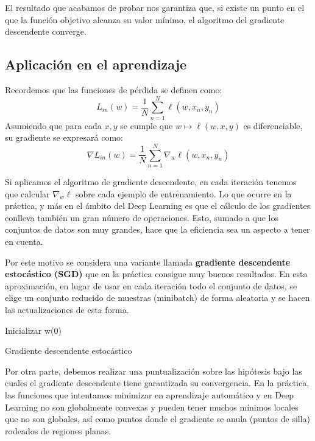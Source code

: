 El resultado que acabamos de probar nos garantiza que, si existe un punto en el que la función objetivo alcanza su valor mínimo, el algoritmo del gradiente descendente converge.

\subsection{Aplicación en el aprendizaje}
Recordemos que las funciones de pérdida se definen como:
$$ L_{in}(w) = \dfrac{1}{N} \sum_{n=1}^{N} \ell(w, x_n, y_n)$$ 
Asumiendo que para cada $x, y$ se cumple que $w \mapsto \ell(w,x,y)$ es diferenciable, su gradiente se expresará como:
$$ \nabla L_{in}(w) = \dfrac{1}{N} \sum_{n=1}^{N} \nabla_w \ell(w, x_n, y_n) $$

Si aplicamos el algoritmo de gradiente descendente, en cada iteración tenemos que calcular $\nabla_w \ell$ sobre cada ejemplo de entrenamiento. Lo que ocurre en la práctica, y más en el ámbito del Deep Learning es que el cálculo de los gradientes conlleva también un gran número de operaciones. Esto, sumado a que los conjuntos de datos son muy grandes, hace que la eficiencia sea un aspecto a tener en cuenta.

Por este motivo se considera una variante llamada \textbf{gradiente descendente estocástico (SGD)} que en la práctica consigue muy buenos resultados. En esta aproximación, en lugar de usar en cada iteración todo el conjunto de datos, se elige un conjunto reducido de muestras (minibatch) de forma aleatoria y se hacen las actualizaciones de esta forma. 

\begin{algorithm}
	\SetAlgoLined
	Inicializar w(0)\\ 
	\caption{Gradiente descendente estocástico}
\end{algorithm}

Por otra parte, debemos realizar una puntualización sobre las hipótesis bajo las cuales el gradiente descendente tiene garantizada su convergencia. En la práctica, las funciones que intentamos minimizar en aprendizaje automático y en Deep Learning no son globalmente convexas y pueden tener muchos mínimos locales que no son globales, así como puntos donde el gradiente se anula (puntos de silla) rodeados de regiones planas.

